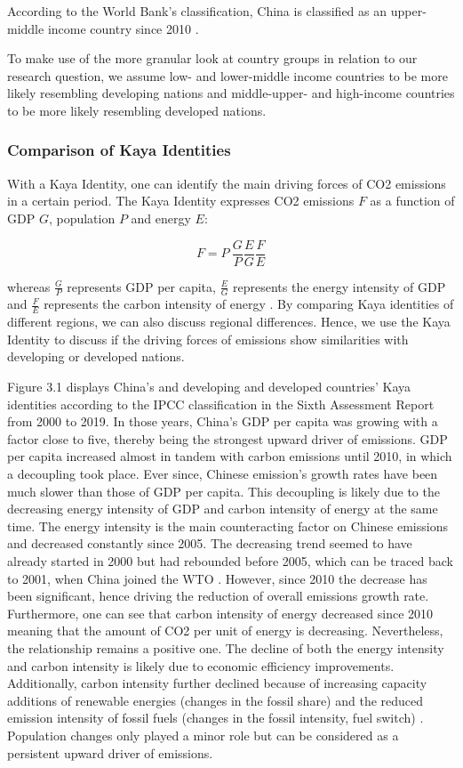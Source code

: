 \documentclass[
  12pt,
]{article}
\numberwithin{equation}{section}
\numberwithin{table}{section}
\numberwithin{figure}{section}
\begin{document}
According to the World Bank's classification, China is classified as an
upper-middle income country since 2010 \citep{WorldBank2022d}.

To make use of the more granular look at country groups in relation to
our research question, we assume low- and lower-middle income countries
to be more likely resembling developing nations and middle-upper- and
high-income countries to be more likely resembling developed nations.

\hypertarget{comparison-of-kaya-identities}{%
\subsubsection{Comparison of Kaya
Identities}\label{comparison-of-kaya-identities}}

With a Kaya Identity, one can identify the main driving forces of CO2
emissions in a certain period. The Kaya Identity expresses CO2 emissions
\(F\) as a function of GDP \(G\), population \(P\) and energy \(E\):

\[F = P \: \frac{G}{P} \frac{E}{G} \frac{F}{E}\]

whereas \(\frac{G}{P}\) represents GDP per capita, \(\frac{E}{G}\)
represents the energy intensity of GDP and \(\frac{F}{E}\) represents
the carbon intensity of energy \citep{Lamb2021}. By comparing Kaya
identities of different regions, we can also discuss regional
differences. Hence, we use the Kaya Identity to discuss if the driving
forces of emissions show similarities with developing or developed
nations.

Figure 3.1 displays China's and developing and developed countries' Kaya
identities according to the IPCC classification in the Sixth Assessment
Report from 2000 to 2019. In those years, China's GDP per capita was
growing with a factor close to five, thereby being the strongest upward
driver of emissions. GDP per capita increased almost in tandem with
carbon emissions until 2010, in which a decoupling took place. Ever
since, Chinese emission's growth rates have been much slower than those
of GDP per capita. This decoupling is likely due to the decreasing
energy intensity of GDP and carbon intensity of energy at the same time.
The energy intensity is the main counteracting factor on Chinese
emissions and decreased constantly since 2005. The decreasing trend
seemed to have already started in 2000 but had rebounded before 2005,
which can be traced back to 2001, when China joined the WTO
\citep{Zheng2020}. However, since 2010 the decrease has been
significant, hence driving the reduction of overall emissions growth
rate. Furthermore, one can see that carbon intensity of energy decreased
since 2010 meaning that the amount of CO2 per unit of energy is
decreasing. Nevertheless, the relationship remains a positive one. The
decline of both the energy intensity and carbon intensity is likely due
to economic efficiency improvements. Additionally, carbon intensity
further declined because of increasing capacity additions of renewable
energies (changes in the fossil share) and the reduced emission
intensity of fossil fuels (changes in the fossil intensity, fuel switch)
\citep{Zheng2020, Peters2017}. Population changes only played a minor
role but can be considered as a persistent upward driver of emissions.
\end{document}
